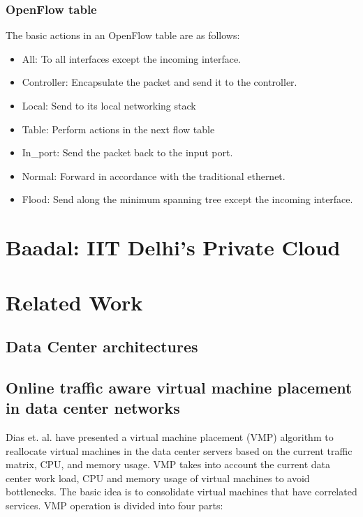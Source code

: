 \subsubsection{OpenFlow table}
The basic actions in an OpenFlow table are as follows:
\begin{itemize}
    \item All: To all interfaces except the incoming interface.
    \item Controller: Encapsulate the packet and send it to the controller.
    \item Local: Send to its local networking stack
    \item Table: Perform actions in the next flow table 
    \item In\_port: Send the packet back to the input port.
    \item Normal: Forward in accordance with the traditional ethernet.
    \item Flood: Send along the minimum spanning tree except the incoming interface.
\end{itemize}


\section{Baadal: IIT Delhi's Private Cloud}

\section{Related Work}

\subsection{Data Center architectures}

\subsection{Online traffic aware virtual machine placement in data center networks}
Dias et. al.\cite{dias2012online} have presented a virtual machine placement (VMP) algorithm to reallocate virtual machines in the data center servers based on the current traffic matrix, CPU, and memory usage. VMP takes into account the current data center work load, CPU and memory usage of virtual machines to avoid bottlenecks. The basic idea is to consolidate virtual machines that have correlated services. VMP operation is divided into four parts:

